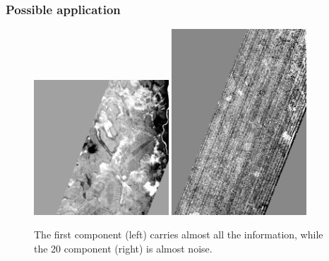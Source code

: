 \documentclass[serif, 12pt]{beamer}
\begin{document}
\begin{frame}
\frametitle{Possible application}

\begin{figure}[h]
\includegraphics[width=0.45\textwidth]{pca1}
\hspace{1em}
\includegraphics[width=0.45\textwidth]{pca20}
\caption{The first component (left) carries almost all the information, while 
the 20 component (right) is almost noise.}
\end{figure}

\end{frame}
\end{document}

